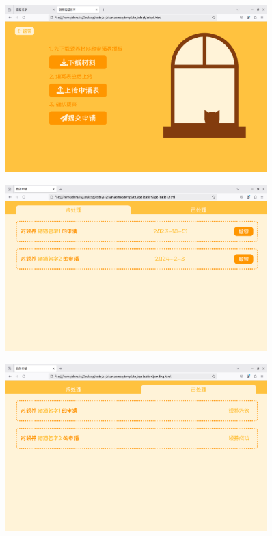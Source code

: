 \documentclass[12pt,a4paper,UTF8]{article}
\begin{document}
\begin{figure}[H]
  \centering
  \includegraphics[width=0.9\textwidth]{figures/AdoptionApply5.png}
\end{figure}

\begin{figure}[H]
  \centering
  \includegraphics[width=0.9\textwidth]{figures/AdoptionApply1.png}
\end{figure}

\begin{figure}[H]
  \centering
  \includegraphics[width=0.9\textwidth]{figures/AdoptionApply2.png}
\end{figure}
\end{document}
